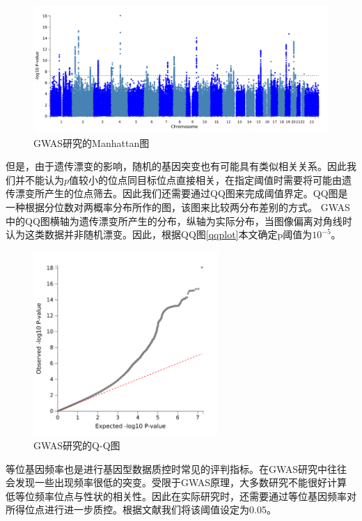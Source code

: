 \begin{figure}[!ht]
\centering
\includegraphics[width=\textwidth]{figures/Chapter2/Maha.png}
\caption{GWAS研究的Manhattan图} \label{fig:manhattan}
\end{figure}

但是，由于遗传漂变的影响，随机的基因突变也有可能具有类似相关关系。因此我们并不能认为$p$值较小的位点同目标位点直接相关，在指定阈值时需要将可能由遗传漂变所产生的位点筛去。因此我们还需要通过QQ图来完成阈值界定。QQ图是一种根据分位数对两概率分布所作的图，该图来比较两分布差别的方式。\cite{wilk_probability_1968} GWAS中的QQ图横轴为遗传漂变所产生的分布，纵轴为实际分布，当图像偏离对角线时认为这类数据并非随机漂变。因此，根据QQ图\ref{qqplot}本文确定p阈值为$10^{-5}$。

\begin{figure}[!ht]
\centering
\includegraphics[width=7cm]{figures/Chapter2/qq.png}
\caption{GWAS研究的Q-Q图} \label{fig:qqplot}
\end{figure}


等位基因频率也是进行基因型数据质控时常见的评判指标。在GWAS研究中往往会发现一些出现频率很低的突变。受限于GWAS原理，大多数研究不能很好计算低等位频率位点与性状的相关性。因此在实际研究时，还需要通过等位基因频率对所得位点进行进一步质控。根据文献我们将该阈值设定为0.05\cite{marees_tutorial_2018}。


